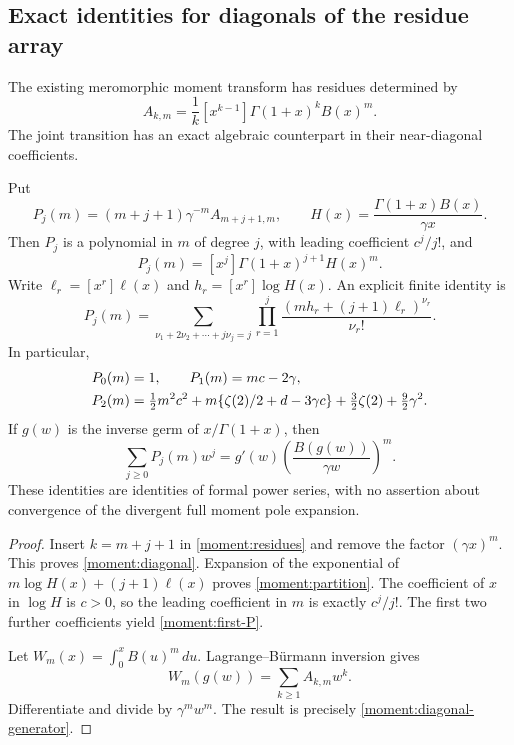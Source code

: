 \subsection{Exact identities for diagonals of the residue array}
The existing meromorphic moment transform has residues determined by
\begin{equation}\label{moment:residues}
 A_{k,m}=\frac1k[x^{k-1}]\Gamma(1+x)^k B(x)^m.
\end{equation}
The joint transition has an exact algebraic counterpart in their
near-diagonal coefficients.

\begin{proposition}\label{moment:prop:diagonals}
Put
\[
 P_j(m)=(m+j+1)\gamma^{-m}A_{m+j+1,m},\qquad
 H(x)=\frac{\Gamma(1+x)B(x)}{\gamma x}.
\]
Then $P_j$ is a polynomial in $m$ of degree $j$, with leading coefficient
$c^j/j!$, and
\begin{equation}\label{moment:diagonal}
 P_j(m)=[x^j]\Gamma(1+x)^{j+1}H(x)^m.
\end{equation}
Write $\ell_r=[x^r]\ell(x)$ and $h_r=[x^r]\log H(x)$. An explicit
finite identity is
\begin{equation}\label{moment:partition}
 P_j(m)=\sum_{\nu_1+2\nu_2+\cdots+j\nu_j=j}
       \prod_{r=1}^j\frac{(mh_r+(j+1)\ell_r)^{\nu_r}}{\nu_r!}.
\end{equation}
In particular,
\begin{align}\label{moment:first-P}
 P_0(m)&=1,\qquad P_1(m)=mc-2\gamma,\notag\\
 P_2(m)&=\tfrac12m^2c^2
       +m\{\zeta(2)/2+d-3\gamma c\}
       +\tfrac32\zeta(2)+\tfrac92\gamma^2.
\end{align}
If $g(w)$ is the inverse germ of $x/\Gamma(1+x)$, then
\begin{equation}\label{moment:diagonal-generator}
 \sum_{j\ge0}P_j(m)w^j
 =g'(w)\left(\frac{B(g(w))}{\gamma w}\right)^m.
\end{equation}
These identities are identities of formal power series, with no
assertion about convergence of the divergent full moment pole expansion.
\end{proposition}

\begin{proof}
Insert $k=m+j+1$ in \eqref{moment:residues} and remove the factor
$(\gamma x)^m$. This proves \eqref{moment:diagonal}.
Expansion of the exponential of
$m\log H(x)+(j+1)\ell(x)$ proves \eqref{moment:partition}.
The coefficient of $x$ in $\log H$ is $c>0$, so the leading coefficient
in $m$ is exactly $c^j/j!$. The first two further coefficients yield
\eqref{moment:first-P}.

Let $W_m(x)=\int_0^x B(u)^m\,du$. Lagrange--B\"urmann inversion gives
\[
 W_m(g(w))=\sum_{k\ge1}A_{k,m}w^k.
\]
Differentiate and divide by $\gamma^m w^m$. The result is precisely
\eqref{moment:diagonal-generator}.
\end{proof}


